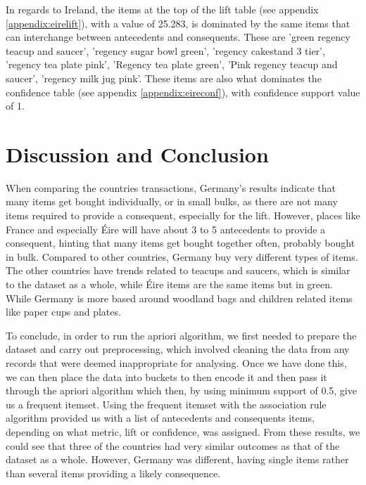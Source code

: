 \documentclass[a4paper,10pt]{article}
\begin{document}
In regards to Ireland, the items at the top of the lift table (see appendix \ref{appendix:eirelift}), with a value of 25.283, is dominated by the same items that can interchange between antecedents and consequents. These are 'green regency teacup and saucer', 'regency sugar bowl green', 'regency cakestand 3 tier', 'regency tea plate pink', 'Regency tea plate green', 'Pink regency teacup and saucer', 'regency milk jug pink'.  These items are also what dominates the confidence table (see appendix \ref{appendix:eireconf}), with confidence support value of 1.


\section{Discussion and Conclusion}

When comparing the countries transactions, Germany's results indicate that many items get bought individually, or in small bulks, as there are not many items required to provide a consequent, especially for the lift. However, places like France and especially Éire will have about 3 to 5 antecedents to provide a consequent, hinting that many items get bought together often, probably bought in bulk. Compared to other countries, Germany buy very different types of items. The other countries have trends related to teacups and saucers, which is similar to the dataset as a whole, while Éire items are the same items but in green. While Germany is more based around woodland bags and children related items like paper cups and plates.

To conclude, in order to run the apriori algorithm, we first needed to prepare the dataset and carry out preprocessing, which involved cleaning the data from any records that were deemed inappropriate for analysing. Once we have done this, we can then place the data into buckets to then encode it and then pass it through the apriori algorithm which then, by using minimum support of 0.5, give us a frequent itemset. Using the frequent itemset with the association rule algorithm provided us with a list of antecedents and consequents items, depending on what metric, lift or confidence, was assigned. From these results, we could see that three of the countries had very similar outcomes as that of the dataset as a whole. However, Germany was different, having single items rather than several items providing a likely consequence.
\end{document}
